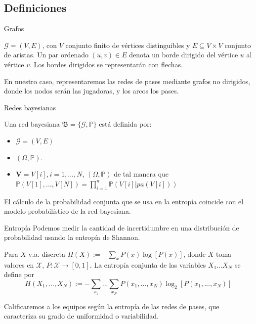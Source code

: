 \documentclass{beamer}
\begin{document}
\subsection{Definiciones}
\begin{frame}{Grafos}
	\begin{definition}
		$\mathcal{G} = (V, E)$, con $V$ conjunto finito de vértices distinguibles y 
		$E \subseteq V \times V$ conjunto de aristas. Un par ordenado $(u, v) \in E$ denota un borde dirigido
		del vértice $u$ al vértice $v$. Los bordes dirigidos se representarán con flechas. 
	\end{definition}
	En nuestro caso, representaremos las redes de pases mediante grafos no dirigidos, donde los nodos serán las 
	jugadoras, y los arcos los pases.
\end{frame}

\begin{frame}{Redes bayesianas}
    \begin{definition} 
        Una red bayesiana $\mathfrak{B} = \lbrace \mathcal{G}, \mathbb{P} \rbrace$ está definida por:
        \begin{itemize}
            \item $\mathcal{G}=(V,E)$ 
            \item $(\Omega, \mathbb{P})$.
            \item $\textbf{V}=V[i], i=1,...,N$, $(\Omega, \mathbb{P})$ 
            de tal manera que $\mathbb{P}(V[1],...,V[N])= \prod_{i=1}^{n}\mathbb{P}(V[i]|pa(V[i]))$
        \end{itemize}
    \end{definition}  
	El cálculo de la probabilidad conjunta que se usa en la entropía coincide con el modelo 
	probabilístico de la red bayesiana.
\end{frame}

\begin{frame}{Entropía}
	Podemos medir la cantidad de incertidumbre en una distribución de probabilidad usando la 
	entropía de Shannon.
	\begin{definition}[Entropía] \label{def:entropy}
        Para $X$ v.a. discreta $H(X):= - \sum_{x} P(x)\log[P(x)]$, donde 
		$X$ toma valores en $\mathcal{X}$, $P:\mathcal{X} \rightarrow [0,1]$.
        La entropía conjunta de las variables $X_1...X_N$ se define por 
        $$H(X_1,...,X_N):=-\sum_{x_1}...\sum_{x_N}P(x_1,...,x_N)\log_{2}[P(x_1,...,x_N)]$$
    \end{definition}
	Calificaremos a los equipos según la entropía de las redes de pases, que caracteriza 
	su grado de uniformidad o variabilidad.
\end{frame}
\end{document}
